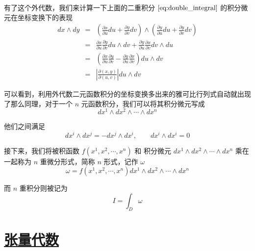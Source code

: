 有了这个外代数，我们来计算一下上面的二重积分 $\ref{eq:double_integral}$ 的积分微元在坐标变换下的表现
\begin{eqnarray}
    dx \wedge dy &=& \left(\frac{\partial x}{\partial u} du + \frac{\partial y}{\partial v} dv\right) \wedge \left(\frac{\partial y}{\partial u} du + \frac{\partial y}{\partial v} dv\right) \nonumber \\
    &=& \frac{\partial x}{\partial u} \frac{\partial y}{\partial v} du \wedge dv + \frac{\partial y}{\partial u} \frac{\partial x}{\partial v} dv \wedge du \nonumber \\
    &=& \left(\frac{\partial x}{\partial u} \frac{\partial y}{\partial v} - \frac{\partial y}{\partial u} \frac{\partial x}{\partial v}\right) du \wedge dv \nonumber \\
    &=& \left| \frac{\partial(x,y)}{\partial(u,v)} \right| du \wedge dv
\end{eqnarray}

可以看到，利用外代数二元函数积分的坐标变换多出来的雅可比行列式自动就出现了那么同理，对于一个 $n$ 元函数积分，我们可以将其积分微元写成
\begin{equation}
    dx^1 \wedge dx^2 \wedge \cdots \wedge dx^n
\end{equation}

他们之间满足
\begin{equation}
    dx^i \wedge dx^j = -dx^j \wedge dx^i,\qquad dx^i \wedge dx^i = 0
\end{equation}

接下来，我们将被积函数 $f(x^1,x^2,\cdots,x^n)$ 和 积分微元 $dx^1 \wedge dx^2 \wedge \cdots \wedge dx^n$ 乘在一起称为 $n$ 重微分形式，简称 $n$ 形式，记作 $\omega$
\begin{equation}
    \omega = f(x^1,x^2,\cdots,x^n) dx^1 \wedge dx^2 \wedge \cdots \wedge dx^n
\end{equation} 

而 $n$ 重积分则被记为
\begin{equation}
    I = \int_D \omega
\end{equation}












\section{\protect\hyperlink{:}{张量代数}}





